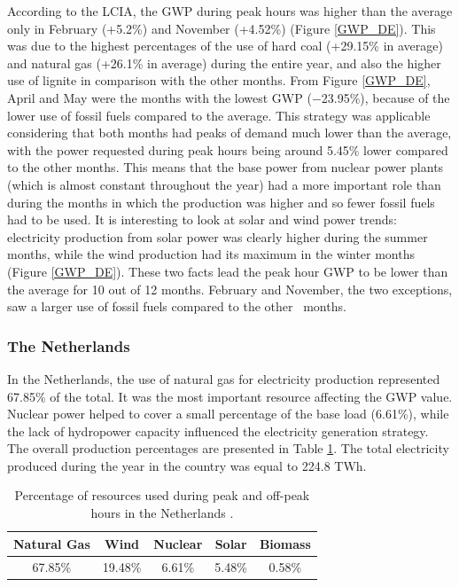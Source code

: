 {\newpage
According to the LCIA, the GWP during peak hours was higher than the average only in  February {(+5.2\%)} and November {(+4.52\%)} (Figure \ref{GWP_DE}). This was due to the highest percentages of the use of hard coal {(+29.15\% in average)} and natural gas {(+26.1\% in average)} during the entire year, and also the higher use of lignite in comparison with the other months. From Figure \ref{GWP_DE}, April and May were the months with the lowest GWP {($-$23.95\%)}, because of the lower use of fossil fuels compared to the average. This strategy was applicable considering that both months had peaks of demand much lower than the average, {with the power requested during peak hours being around 5.45\% lower compared to the other months}. This means that the base power from nuclear power plants (which is almost constant throughout the year) had a more important role than during the months in which the production was higher and so fewer fossil fuels had to be used. It is interesting to look at solar and wind power trends: electricity production from solar power was clearly higher during the summer months, while the wind production had its maximum in the winter months (Figure \ref{GWP_DE}). These two facts lead the peak hour GWP to be lower than the average  for 10 out of 12 months. February and November, the two exceptions, saw a larger use of fossil fuels compared to the {other}%
~months. 


\subsubsection{The Netherlands}

In the Netherlands, the use of natural gas for electricity production represented  67.85\% of the total. It was the most important resource affecting the GWP value. Nuclear power helped to cover a small percentage of the base load {(6.61\%)}, while the lack of hydropower capacity influenced the electricity generation strategy.  The overall production percentages are presented in Table \ref{RES_NL}.  The total electricity produced during the year in the country was equal to 224.8 TWh.

 \begin{table}[]
\centering
\caption{Percentage of resources used during peak and off-peak hours in the Netherlands \cite{Entso-eProduction}.}
\label{RES_NL}
\begin{tabular}{ccccc}
\toprule
\textbf{Natural Gas} & \textbf{Wind} & \textbf{Nuclear} & \textbf{Solar}  & \textbf{Biomass}  \\ \hline
      67.85\%       & 19.48\%        & 6.61\%           & 5.48\%           & 0.58\%         \\ \bottomrule
\end{tabular}
\end{table}

}
